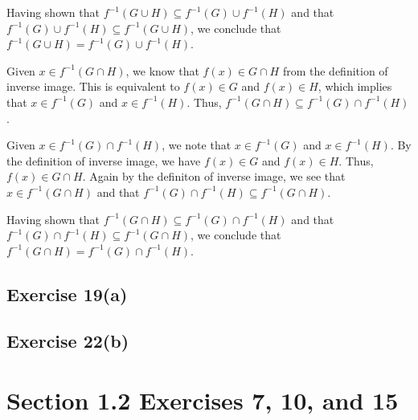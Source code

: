 \documentclass[12pt]{article}
\begin{document}
Having shown that $f^{-1}\left(G \cup H\right) \subseteq f^{-1}(G) \cup f^{-1}(H)$ and that $f^{-1}(G) \cup f^{-1}(H) \subseteq f^{-1}\left(G \cup H\right)$, we conclude that $f^{-1}\left(G \cup H\right) = f^{-1}(G) \cup f^{-1}(H)$.


Given $x \in f^{-1}\left(G \cap H\right)$, we know that $f\left(x\right) \in G \cap H$ from the definition of inverse image. This is equivalent to $f(x) \in G$ and $f(x) \in H$, which implies that $x \in f^{-1}(G)$ and $x \in f^{-1}(H)$. Thus, $f^{-1}\left(G \cap H\right) \subseteq f^{-1}(G) \cap f^{-1}(H)$.

Given $x \in f^{-1}(G) \cap f^{-1}(H)$, we note that $x \in f^{-1}(G)$ and $x \in f^{-1}(H)$. By the definition of inverse image, we have $f(x) \in G$ and $f(x) \in H$. Thus, $f(x) \in G \cap H$. Again by the definiton of inverse image, we see that $x \in f^{-1}\left(G \cap H\right)$ and that $f^{-1}(G) \cap f^{-1}(H) \subseteq f^{-1}\left(G \cap H\right)$.

Having shown that $f^{-1}\left(G \cap H\right) \subseteq f^{-1}(G) \cap f^{-1}(H)$ and that $f^{-1}(G) \cap f^{-1}(H) \subseteq f^{-1}\left(G \cap H\right)$, we conclude that $f^{-1}\left(G \cap H\right) = f^{-1}(G) \cap f^{-1}(H)$.

\subsection*{Exercise 19(a)}
\subsection*{Exercise 22(b)}

\section*{Section 1.2 Exercises 7, 10, and 15}
\end{document}
